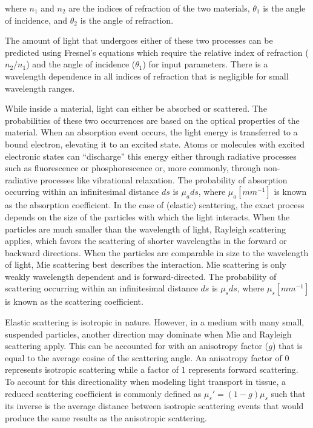 \noindent where $n_1$ and $n_2$ are the indices of refraction of the two materials, $\theta_1$ is the angle of incidence, and $\theta_2$ is the angle of refraction.

The amount of light that undergoes either of these two processes can be predicted using Fresnel's equations which require the relative index of refraction ($n_2 / n_1$) and the angle of incidence ($\theta_1$) for input parameters.\cite{Pedrotti1993} There is a wavelength dependence in all indices of refraction that is negligible for small wavelength ranges.\cite{Doornbos1999,Knight2013}

While inside a material, light can either be absorbed or scattered. The probabilities of these two occurrences are based on the optical properties of the material. When an absorption event occurs, the light energy is transferred to a bound electron, elevating it to an excited state.\cite{Jacques2004} Atoms or molecules with excited electronic states can ``discharge'' this energy either through radiative processes such as fluorescence or phosphorescence or, more commonly, through non-radiative processes like vibrational relaxation. The probability of absorption occurring within an infinitesimal distance $ds$ is $\mu_ads$, where $\mu_a [mm^{-1}]$ is known as the absorption coefficient. In the case of (elastic) scattering, the exact process depends on the size of the particles with which the light interacts. When the particles are much smaller than the wavelength of light, Rayleigh scattering applies, which favors the scattering of shorter wavelengths in the forward or backward directions.\cite{Prasad2003} When the particles are comparable in size to the wavelength of light, Mie scattering best describes the interaction. Mie scattering is only weakly wavelength dependent and is forward-directed.\cite{Jacques2004} The probability of scattering occurring within an infinitesimal distance $ds$ is $\mu_sds$, where $\mu_s [mm^{-1}]$ is known as the scattering coefficient. 

Elastic scattering is isotropic in nature. However, in a medium with many small, suspended particles, another direction may dominate when Mie and Rayleigh scattering apply. This can be accounted for with an anisotropy factor ($g$) that is equal to the average cosine of the scattering angle. An anisotropy factor of $0$ represents isotropic scattering while a factor of $1$ represents forward scattering. To account for this directionality when modeling light transport in tissue, a reduced scattering coefficient is commonly defined as $\mu_s'=(1-g)\mu_s$ such that its inverse is the average distance between isotropic scattering events that would produce the same results as the anisotropic scattering.\cite{Gratton2004}

